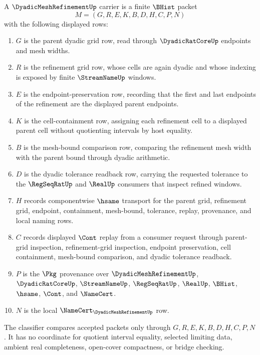 \begin{definition}
\label{def:dyadic-mesh-refinement-carrier}
A $\DyadicMeshRefinementUp$ carrier is a finite $\BHist$ packet
$$
M=(G,R,E,K,B,D,H,C,P,N)
$$
with the following displayed rows:
\begin{enumerate}
\item $G$ is the parent dyadic grid row, read through $\DyadicRatCoreUp$ endpoints and mesh widths.
\item $R$ is the refinement grid row, whose cells are again dyadic and whose indexing is exposed by finite $\StreamNameUp$ windows.
\item $E$ is the endpoint-preservation row, recording that the first and last endpoints of the refinement are the displayed parent endpoints.
\item $K$ is the cell-containment row, assigning each refinement cell to a displayed parent cell without quotienting intervals by host equality.
\item $B$ is the mesh-bound comparison row, comparing the refinement mesh width with the parent bound through dyadic arithmetic.
\item $D$ is the dyadic tolerance readback row, carrying the requested tolerance to the $\RegSeqRatUp$ and $\RealUp$ consumers that inspect refined windows.
\item $H$ records componentwise $\hsame$ transport for the parent grid, refinement grid, endpoint, containment, mesh-bound, tolerance, replay, provenance, and local naming rows.
\item $C$ records displayed $\Cont$ replay from a consumer request through parent-grid inspection, refinement-grid inspection, endpoint preservation, cell containment, mesh-bound comparison, and dyadic tolerance readback.
\item $P$ is the $\Pkg$ provenance over $\DyadicMeshRefinementUp$, $\DyadicRatCoreUp$, $\StreamNameUp$, $\RegSeqRatUp$, $\RealUp$, $\BHist$, $\hsame$, $\Cont$, and $\NameCert$.
\item $N$ is the local $\NameCert_{\DyadicMeshRefinementUp}$ row.
\end{enumerate}
The classifier compares accepted packets only through $G,R,E,K,B,D,H,C,P,N$. It has no coordinate for quotient interval equality, selected limiting data, ambient real completeness, open-cover compactness, or bridge checking.
\end{definition}

